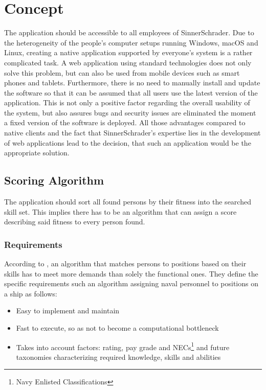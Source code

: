 \chapter{Concept}
The application should be accessible to all employees of SinnerSchrader. Due to the heterogeneity of the people’s computer setups running Windows, macOS and Linux, creating a native application supported by everyone’s system is a rather complicated task. A web application using standard technologies does not only solve this problem, but can also be used from mobile devices such as smart phones and tablets. Furthermore, there is no need to manually install and update the software so that it can be assumed that all users use the latest version of the application. This is not only a positive factor regarding the overall usability of the system, but also assures bugs and security issues are eliminated the moment a fixed version of the software is deployed. All those advantages compared to native clients and the fact that SinnerSchrader’s expertise lies in the development of web applications lead to the decision, that such an application would be the appropriate solution.

\section{Scoring Algorithm}
The application should sort all found persons by their fitness into the searched skill set.
This implies there has to be an algorithm that can assign a score describing said fitness to every person found.

\subsection{Requirements}
According to \cite{USN}, an algorithm that matches persons to positions based on their skills has to meet more demands than solely the functional ones. They define the specific requirements such an algorithm assigning naval personnel to positions on a ship as follows:
\begin{itemize}
  \item Easy to implement and maintain
  \item Fast to execute, so as not to become a computational bottleneck
  \item Takes into account factors: rating, pay grade and NECs\footnote{Navy Enlisted Classifications} and future taxonomies characterizing required knowledge, skills and abilities
\end{itemize}\cite[P. 14]{USN}

